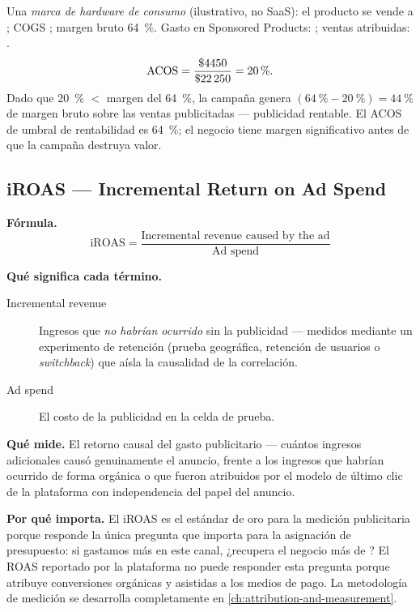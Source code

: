 \begin{example}
Una \textit{marca de hardware de consumo} (ilustrativo, no SaaS): el producto se vende a
; COGS ; margen bruto \qty{64}{\percent}. Gasto en Sponsored Products:
; ventas atribuidas: .
\[
  \mathrm{ACOS} = \frac{\$\num{4450}}{\$\num{22250}} = \qty{20}{\percent}.
\]
Dado que \qty{20}{\percent} $<$ margen del \qty{64}{\percent}, la campaña genera
$(\qty{64}{\percent} - \qty{20}{\percent}) = \qty{44}{\percent}$ de margen bruto sobre las
ventas publicitadas --- publicidad rentable. El ACOS de umbral de rentabilidad es
\qty{64}{\percent}; el negocio tiene margen significativo antes de que la campaña destruya
valor.
\end{example}


\subsection{iROAS --- Incremental Return on Ad Spend}

\textbf{Fórmula.}
\[
  \mathrm{iROAS} = \frac{\text{Incremental revenue caused by the ad}}{\text{Ad spend}}
\]

\textbf{Qué significa cada término.}
\begin{description}
  \item[Incremental revenue] Ingresos que \emph{no habrían ocurrido} sin la publicidad ---
    medidos mediante un experimento de retención (prueba geográfica, retención de usuarios o
    \emph{switchback}) que aísla la causalidad de la correlación.
  \item[Ad spend] El costo de la publicidad en la celda de prueba.
\end{description}

\textbf{Qué mide.} El retorno causal del gasto publicitario --- cuántos ingresos adicionales
causó genuinamente el anuncio, frente a los ingresos que habrían ocurrido de forma orgánica
o que fueron atribuidos por el modelo de último clic de la plataforma con independencia del
papel del anuncio.

\textbf{Por qué importa.} El iROAS es el estándar de oro para la medición publicitaria
porque responde la única pregunta que importa para la asignación de presupuesto: si gastamos
 más en este canal, ¿recupera el negocio más de ? El ROAS reportado por la
plataforma no puede responder esta pregunta porque atribuye conversiones orgánicas y asistidas
a los medios de pago. La metodología de medición se desarrolla completamente en
\cref{ch:attribution-and-measurement}.

